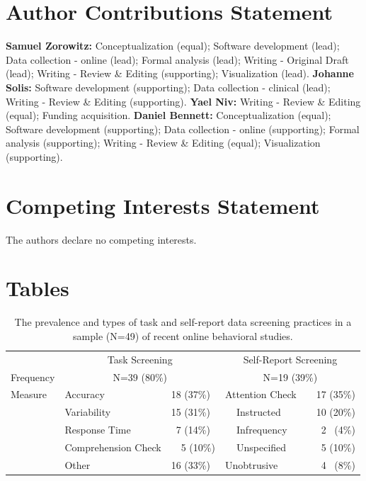 \documentclass[a4paper,notitlepage,12pt]{article}
\begin{document}
\section*{Author Contributions Statement}

\textbf{Samuel Zorowitz:} Conceptualization (equal); Software development (lead); Data collection - online (lead); Formal analysis (lead); Writing - Original Draft (lead); Writing - Review \& Editing (supporting); Visualization (lead). \textbf{Johanne Solis:} Software development (supporting); Data collection - clinical (lead); Writing - Review \& Editing (supporting). \textbf{Yael Niv:} Writing - Review \& Editing (equal); Funding acquisition. \textbf{Daniel Bennett:} Conceptualization (equal); Software development (supporting); Data collection - online (supporting); Formal analysis (supporting); Writing - Review \& Editing (equal); Visualization (supporting).

\section*{Competing Interests Statement}

The authors declare no competing interests.

\clearpage
\section*{Tables}

\begin{table}[h]
    \centering
    \small
    \setlength{\tabcolsep}{8pt}
    \begin{tabular}{lllrllr}
        \toprule
        & \multicolumn{2}{c}{Task Screening} & \multicolumn{4}{c}{Self-Report Screening} \\
        \cmidrule(lr){2-3} \cmidrule(lr){4-7}
        Frequency & \multicolumn{2}{c}{N=39 (80\%)} & \multicolumn{4}{c}{N=19 (39\%)} \\
        \midrule
        Measure & Accuracy & 18 (37\%) & \multicolumn{2}{l}{Attention Check} & & 17 (35\%) \\
        & Variability & 15 (31\%) & & Instructed & & 10 (20\%) \\
        & Response Time & \ 7 (14\%) & & Infrequency & & 2 \, (4\%) \\
        & Comprehension Check & \ \ 5 (10\%) & & Unspecified & & 5 (10\%) \\
        & Other & 16 (33\%) & \multicolumn{2}{l}{Unobtrusive} & & \ 4 \, (8\%) \\
        \bottomrule
    \end{tabular}
    \caption{The prevalence and types of task and self-report data screening practices in a sample (N=49) of recent online behavioral studies.}
    \label{tab:tab01}
\end{table}
\end{document}
